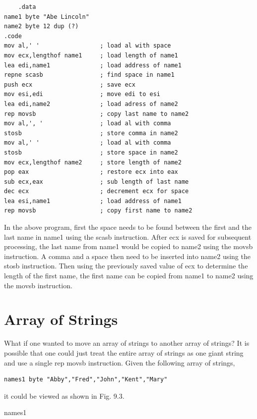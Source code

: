 \documentclass[10pt]{book}
\begin{document}
\begin{verbatim}
    .data
name1 byte "Abe Lincoln"
name2 byte 12 dup (?)
.code
mov al,' '                 ; load al with space
mov ecx,lengthof name1     ; load length of name1
lea edi,name1              ; load address of name1
repne scasb                ; find space in name1
push ecx                   ; save ecx
mov esi,edi                ; move edi to esi
lea edi,name2              ; load adress of name2
rep movsb                  ; copy last name to name2
mov al,', '                ; load al with comma
stosb                      ; store comma in name2
mov al,' '                 ; load al with comma
stosb                      ; store space in name2
mov ecx,lengthof name2     ; store length of name2
pop eax                    ; restore ecx into eax
sub ecx,eax                ; sub length of last name
dec ecx                    ; decrement ecx for space
lea esi,name1              ; load address of name1
rep movsb                  ; copy first name to name2
\end{verbatim}

In the above program, first the space needs to be found between the first and the last name in name1 using the scasb instruction. After ecx is saved for subsequent processing, the last name from name1 would be copied to name2 using the movsb instruction. A comma and a space then need to be inserted into name2 using the stosb instruction. Then using the previously saved value of ecx to determine the length of the first name, the first name can be copied from name1 to name2 using the movsb instruction.

\section{Array of Strings}
What if one wanted to move an array of strings to another array of strings? It is possible that one could just treat the entire array of strings as one giant string and use a single rep movsb instruction. Given the following array of strings,

\begin{verbatim}
names1 byte "Abby","Fred","John","Kent","Mary"
\end{verbatim}

it could be viewed as shown in Fig. 9.3.

names1
\end{document}
